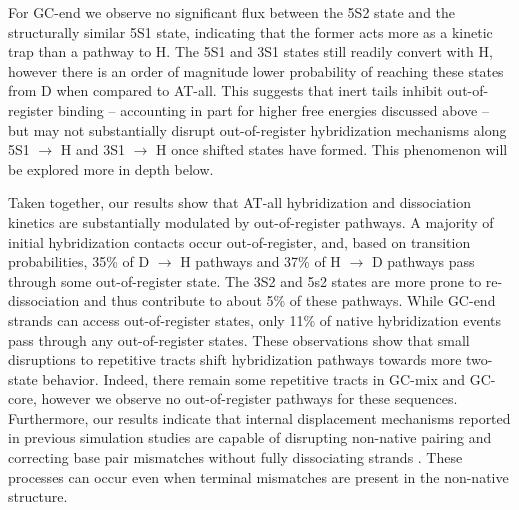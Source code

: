\documentclass[journal=jpcbfk,manuscript=article]{achemso}
\begin{document}
For GC-end we observe no significant flux between the 5S2 state and the structurally similar 5S1 state, indicating that the former acts more as a kinetic trap than a pathway to H. The 5S1 and 3S1 states still readily convert with H, however there is an order of magnitude lower probability of reaching these states from D when compared to AT-all. This suggests that inert tails inhibit out-of-register binding -- accounting in part for higher free energies discussed above -- but may not substantially disrupt out-of-register hybridization mechanisms along 5S1 $\rightarrow$ H and 3S1 $\rightarrow$ H once shifted states have formed. This phenomenon will be explored more in depth below.



Taken together, our results show that AT-all hybridization and dissociation kinetics are substantially modulated by out-of-register pathways. A majority of initial hybridization contacts occur out-of-register, and, based on transition probabilities, 35\% of D $\rightarrow$ H pathways and 37\% of H $\rightarrow$ D pathways pass through some out-of-register state. The 3S2 and 5s2 states are more prone to re-dissociation and thus contribute to about 5\% of these pathways. While GC-end strands can access out-of-register states, only 11\% of native hybridization events pass through any out-of-register states. These observations show that small disruptions to repetitive tracts shift hybridization pathways towards more two-state behavior. Indeed, there remain some repetitive tracts in GC-mix and GC-core, however we observe no out-of-register pathways for these sequences. Furthermore, our results indicate that internal displacement mechanisms reported in previous simulation studies are capable of disrupting non-native pairing and correcting base pair mismatches without fully dissociating strands \citep{Romano2013DNADependence, Markegard2015, Maciejczyk2014DNAModel}. These processes can occur even when terminal mismatches are present in the non-native structure.
\end{document}
